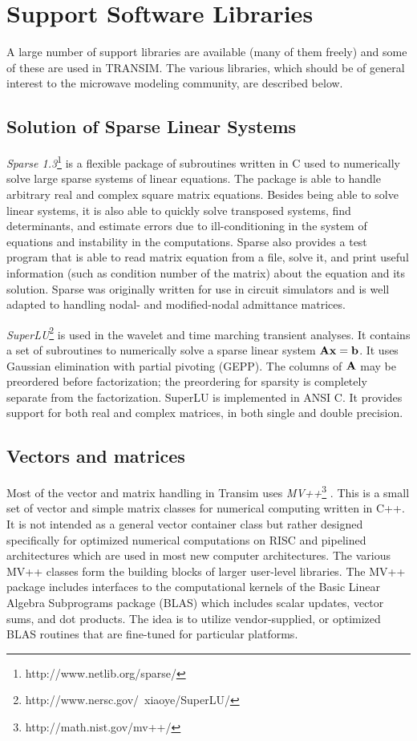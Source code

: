 \chapter{Support Software Libraries \label{app_library_ref}}

A large number of support libraries are available (many of them
freely) and some of these are used in TRANSIM. The various libraries,
which should be of general interest to the microwave modeling
community, are described below.

\section{Solution of Sparse Linear Systems}

\emph{Sparse 1.3}\footnote{http://www.netlib.org/sparse/}
\cite{Sparse} is a flexible package of subroutines written in C used
to numerically solve large sparse systems of linear equations.  The
package is able to handle arbitrary real and complex square matrix
equations.  Besides being able to solve linear systems, it is also
able to quickly solve transposed systems, find determinants, and
estimate errors due to ill-conditioning in the system of equations and
instability in the computations. Sparse also provides a test program
that is able to read matrix equation from a file, solve it, and print
useful information (such as condition number of the matrix) about the
equation and its solution. Sparse was originally written for use in
circuit simulators and is well adapted to handling nodal- and
modified-nodal admittance matrices.

\emph{SuperLU}\footnote{http://www.nersc.gov/~xiaoye/SuperLU/} is used
in the wavelet and time marching transient analyses. It contains a set
of subroutines to numerically solve a sparse linear system ${\bf A}
{\bf x} = {\bf b}$. It uses Gaussian elimination with partial pivoting
(GEPP). The columns of ${\bf A}$ may be preordered before
factorization; the preordering for sparsity is completely separate
from the factorization. SuperLU is implemented in ANSI C. It provides
support for both real and complex matrices, in both single and double
precision.

\section{Vectors and matrices}

Most of the vector and matrix handling in Transim uses
\emph{MV++}\footnote{http://math.nist.gov/mv++/} \cite{mv++}.  This is
a small set of vector and simple matrix classes for numerical
computing written in C++. It is not intended as a general vector
container class but rather designed specifically for optimized
numerical computations on RISC and pipelined architectures which are
used in most new computer architectures. The various MV++ classes form
the building blocks of larger user-level libraries.  The MV++ package
includes interfaces to the computational kernels of the Basic Linear
Algebra Subprograms package (BLAS) which includes scalar updates,
vector sums, and dot products. The idea is to utilize vendor-supplied,
or optimized BLAS routines that are fine-tuned for particular
platforms.

